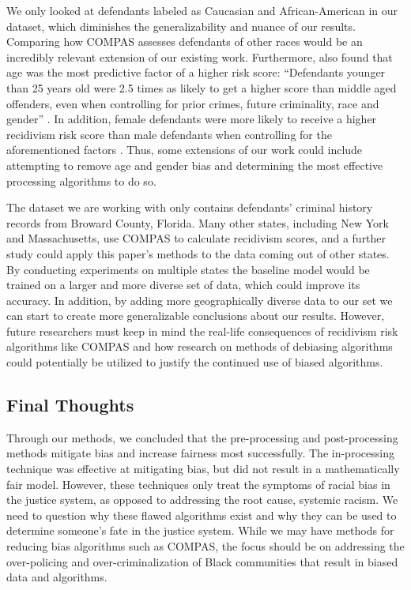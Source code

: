 \documentclass[water,article,submit,moreauthors,pdftex]{mdpi}
\begin{document}
We only looked at defendants labeled as Caucasian and African-American
in our dataset, which diminishes the generalizability and nuance of our
results. Comparing how COMPAS assesses defendants of other races would
be an incredibly relevant extension of our existing work. Furthermore,
\citet{larson2016we} also found that age was the most predictive factor
of a higher risk score: ``Defendants younger than 25 years old were 2.5
times as likely to get a higher score than middle aged offenders, even
when controlling for prior crimes, future criminality, race and gender''
\citep{larson2016we}. In addition, female defendants were more likely to
receive a higher recidivism risk score than male defendants when
controlling for the aforementioned factors \citep{larson2016we}. Thus,
some extensions of our work could include attempting to remove age and
gender bias and determining the most effective processing algorithms to
do so.

The dataset we are working with only contains defendants' criminal
history records from Broward County, Florida. Many other states,
including New York and Massachusetts, use COMPAS to calculate recidivism
scores, and a further study could apply this paper's methods to the data
coming out of other states. By conducting experiments on multiple states
the baseline model would be trained on a larger and more diverse set of
data, which could improve its accuracy. In addition, by adding more
geographically diverse data to our set we can start to create more
generalizable conclusions about our results. However, future researchers
must keep in mind the real-life consequences of recidivism risk
algorithms like COMPAS and how research on methods of debiasing
algorithms could potentially be utilized to justify the continued use of
biased algorithms.

\hypertarget{final-thoughts}{%
\subsection{Final Thoughts}\label{final-thoughts}}

Through our methods, we concluded that the pre-processing and
post-processing methods mitigate bias and increase fairness most
successfully. The in-processing technique was effective at mitigating
bias, but did not result in a mathematically fair model. However, these
techniques only treat the symptoms of racial bias in the justice system,
as opposed to addressing the root cause, systemic racism. We need to
question why these flawed algorithms exist and why they can be used to
determine someone's fate in the justice system. While we may have
methods for reducing bias algorithms such as COMPAS, the focus should be
on addressing the over-policing and over-criminalization of Black
communities that result in biased data and algorithms.
\end{document}
